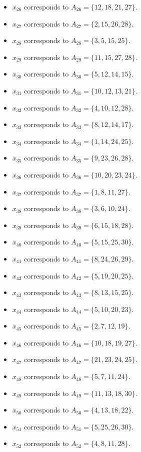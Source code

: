 \documentclass[11pt]{article}
\begin{document}
\begin{itemize}
\item $x_{26}$ corresponds to $A_{26}=\{12, 18, 21, 27\}$.
\item $x_{27}$ corresponds to $A_{27}=\{2, 15, 26, 28\}$.
\item $x_{28}$ corresponds to $A_{28}=\{3, 5, 15, 25\}$.
\item $x_{29}$ corresponds to $A_{29}=\{11, 15, 27, 28\}$.
\item $x_{30}$ corresponds to $A_{30}=\{5, 12, 14, 15\}$.
\item $x_{31}$ corresponds to $A_{31}=\{10, 12, 13, 21\}$.
\item $x_{32}$ corresponds to $A_{32}=\{4, 10, 12, 28\}$.
\item $x_{33}$ corresponds to $A_{33}=\{8, 12, 14, 17\}$.
\item $x_{34}$ corresponds to $A_{34}=\{1, 14, 24, 25\}$.
\item $x_{35}$ corresponds to $A_{35}=\{9, 23, 26, 28\}$.
\item $x_{36}$ corresponds to $A_{36}=\{10, 20, 23, 24\}$.
\item $x_{37}$ corresponds to $A_{37}=\{1, 8, 11, 27\}$.
\item $x_{38}$ corresponds to $A_{38}=\{3, 6, 10, 24\}$.
\item $x_{39}$ corresponds to $A_{39}=\{6, 15, 18, 28\}$.
\item $x_{40}$ corresponds to $A_{40}=\{5, 15, 25, 30\}$.
\item $x_{41}$ corresponds to $A_{41}=\{8, 24, 26, 29\}$.
\item $x_{42}$ corresponds to $A_{42}=\{5, 19, 20, 25\}$.
\item $x_{43}$ corresponds to $A_{43}=\{8, 13, 15, 25\}$.
\item $x_{44}$ corresponds to $A_{44}=\{5, 10, 20, 23\}$.
\item $x_{45}$ corresponds to $A_{45}=\{2, 7, 12, 19\}$.
\item $x_{46}$ corresponds to $A_{46}=\{10, 18, 19, 27\}$.
\item $x_{47}$ corresponds to $A_{47}=\{21, 23, 24, 25\}$.
\item $x_{48}$ corresponds to $A_{48}=\{5, 7, 11, 24\}$.
\item $x_{49}$ corresponds to $A_{49}=\{11, 13, 18, 30\}$.
\item $x_{50}$ corresponds to $A_{50}=\{4, 13, 18, 22\}$.
\item $x_{51}$ corresponds to $A_{51}=\{5, 25, 26, 30\}$.
\item $x_{52}$ corresponds to $A_{52}=\{4, 8, 11, 28\}$.

\end{itemize}
\end{document}
